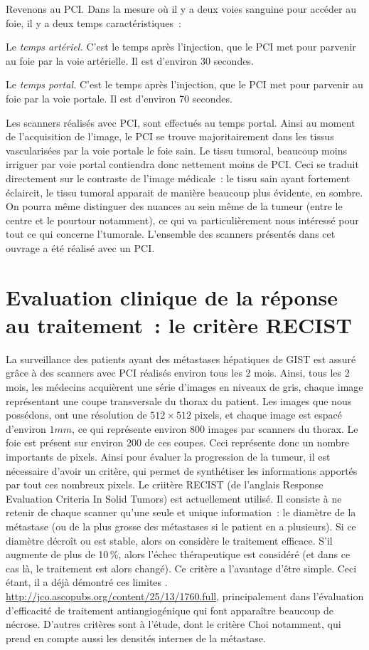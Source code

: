 \documentclass[main.tex]{subfiles}
\begin{document}
Revenons au PCI. Dans la mesure où il y a deux voies sanguine pour accéder au foie, il y a deux temps caractéristiques~:
\begin{myitemize}
\item Le \emph{temps artériel.} C'est le temps après l'injection, que le PCI met pour parvenir au foie par la voie artérielle. Il est d'environ 30 secondes.
\item Le \emph{temps portal.} C'est le temps après l'injection, que le PCI met pour parvenir au foie par la voie portale. Il est d'environ 70 secondes. 
\end{myitemize}
Les scanners réalisés avec PCI, sont effectués au temps portal. Ainsi au moment de l'acquisition de l'image, le PCI se trouve majoritairement dans les tissus vascularisées par la voie portale \ie le foie sain. Le tissu tumoral, beaucoup moins irriguer par voie portal contiendra donc nettement moins de PCI. Ceci se traduit directement sur le contraste de l'image médicale~: le tissu sain ayant fortement éclaircit, le tissu tumoral apparait de manière beaucoup plus évidente, en sombre. On pourra même distinguer des nuances au sein même de la tumeur (entre le centre et le pourtour notamment), ce qui va particulièrement nous intéressé pour tout ce qui concerne l'\hetero tumorale. L'ensemble des scanners présentés dans cet ouvrage a été réalisé avec un PCI.

\section{Evaluation clinique de la réponse au traitement~: le critère RECIST}
La surveillance des patients ayant des métastases hépatiques de GIST est assuré grâce à des scanners avec PCI réalisés environ tous les 2 mois. Ainsi, tous les 2 mois, les médecins acquièrent une série d'images en niveaux de gris, chaque image représentant une coupe transversale du thorax du patient. Les images que nous possédons, ont une résolution de $512\times512$ pixels, et chaque image est espacé d'environ $1mm$, ce qui représente environ 800 images par scanners du thorax. Le foie est présent sur environ 200 de ces coupes. Ceci représente donc un nombre importants de pixels. Ainsi pour évaluer la progression de la tumeur, il est nécessaire d'avoir un critère, qui permet de synthétiser les informations apportés par tout ces nombreux pixels. Le criitère RECIST (de l'anglais Response Evaluation Criteria In Solid Tumors) est actuellement utilisé. Il consiste à ne retenir de chaque scanner qu'une seule et unique information~: le diamètre de la métastase (ou de la plus grosse des métastases si le patient en a plusieurs). Si ce diamètre décroît ou est stable, alors on considère le traitement efficace. S'il augmente de plus de 10\,\%, alors l'échec thérapeutique est considéré (et dans ce cas là, le traitement est alors changé). Ce critère  a l'avantage d'être simple. Ceci étant, il a déjà démontré ces limites \cf. \url{http://jco.ascopubs.org/content/25/13/1760.full}, principalement dans l'évaluation d'efficacité de traitement antiangiogénique qui font apparaître beaucoup de nécrose. 
D'autres critères sont à l'étude, dont le critère Choi notamment, qui prend en compte aussi les densités internes de la métastase. 
\end{document}
